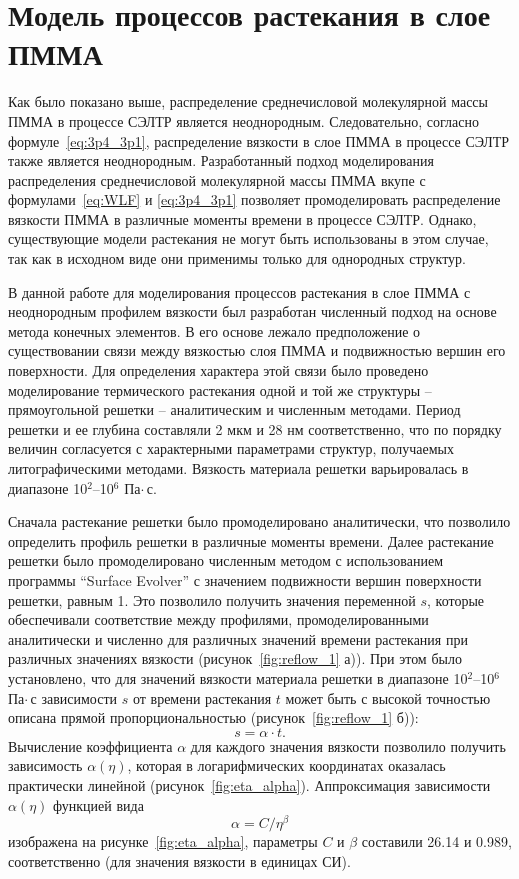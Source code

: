 \section{Модель процессов растекания в слое ПММА}

Как было показано выше, распределение среднечисловой молекулярной массы ПММА в процессе СЭЛТР является неоднородным. Следовательно, согласно формуле~\ref{eq:3p4_3p1}, распределение вязкости в слое ПММА в процессе СЭЛТР также является неоднородным. Разработанный подход моделирования распределения среднечисловой молекулярной массы ПММА вкупе с формулами~\ref{eq:WLF} и \ref{eq:3p4_3p1} позволяет промоделировать распределение вязкости ПММА в различные моменты времени в процессе СЭЛТР. Однако, существующие модели растекания не могут быть использованы в этом случае, так как в исходном виде они применимы только для однородных структур.

В данной работе для моделирования процессов растекания в слое \linebreak ПММА с неоднородным профилем вязкости был разработан численный подход на основе метода конечных элементов. В его основе лежало предположение о существовании связи между вязкостью слоя ПММА и подвижностью вершин его поверхности. Для определения характера этой связи было проведено моделирование термического растекания одной и той же структуры -- прямоугольной решетки -- аналитическим и численным методами. Период решетки и ее глубина составляли 2 мкм и 28 нм соответственно, что по порядку величин согласуется с характерными параметрами структур, получаемых литографическими методами. Вязкость материала решетки варьировалась в диапазоне 10$^\text{2}$--10$^\text{6}$ Па\:$\cdot$\,с.

Сначала растекание решетки было промоделировано аналитически, что позволило определить профиль решетки в различные моменты времени. Далее растекание решетки было промоделировано численным методом с использованием программы ``Surface Evolver'' с значением подвижности вершин поверхности решетки, равным 1. Это позволило получить значения переменной $s$, которые обеспечивали соответствие между профилями, промоделированными аналитически и численно для различных значений времени растекания при различных значениях вязкости (рисунок~\ref{fig:reflow_1} а)). При этом было установлено, что для значений вязкости материала решетки в диапазоне 10$^\text{2}$--10$^\text{6}$ Па\:$\cdot$\,с зависимости $s$ от времени растекания $t$ может быть с высокой точностью описана прямой пропорциональностью (рисунок~\ref{fig:reflow_1} б)):
\begin{equation}
	s = \alpha \cdot t.
\end{equation}
Вычисление коэффициента $\alpha$ для каждого значения вязкости позволило получить зависимость $\alpha(\eta)$, которая в логарифмических координатах оказалась практически линейной (рисунок~\ref{fig:eta_alpha}). Аппроксимация зависимости $\alpha(\eta)$ функцией вида
\begin{equation}
	\alpha = C / \eta^\beta
\end{equation}
изображена на рисунке~\ref{fig:eta_alpha}, параметры $C$ и $\beta$ составили 26.14 и 0.989, соответственно (для значения вязкости в единицах СИ).

